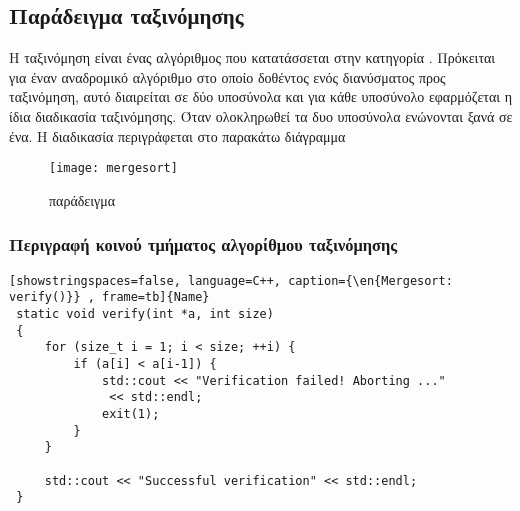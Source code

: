 \subsection{Παράδειγμα ταξινόμησης }
\mbox{}
Η ταξινόμηση \emph{} είναι ένας αλγόριθμος που κατατάσσεται στην κατηγορία . Πρόκειται για έναν αναδρομικό αλγόριθμο στο οποίο
δοθέντος ενός διανύσματος προς ταξινόμηση, αυτό διαιρείται σε δύο υποσύνολα και για κάθε υποσύνολο εφαρμόζεται η ίδια διαδικασία ταξινόμησης. Όταν ολοκληρωθεί τα δυο υποσύνολα ενώνονται ξανά σε ένα. Η διαδικασία περιγράφεται στο παρακάτω διάγραμμα\cite{wiki_mergesort}

\begin{figure}[h]
\texttt{[image: mergesort]}
\centering
\captionsetup{justification=centering, singlelinecheck=false}
	\caption{ παράδειγμα}
\label{fig:mergesort}
\end{figure}


\subsubsection{Περιγραφή κοινού τμήματος αλγορίθμου ταξινόμησης }
\mbox{}

\begin{spacing}{1.0}
\begin{lstlisting}[showstringspaces=false, language=C++, caption={\en{Mergesort: verify()}} , frame=tb]{Name}
 static void verify(int *a, int size)
 {
     for (size_t i = 1; i < size; ++i) {
         if (a[i] < a[i-1]) {
             std::cout << "Verification failed! Aborting ..."
              << std::endl;
             exit(1);
         }
     }

     std::cout << "Successful verification" << std::endl;
 }


\end{lstlisting}
\end{spacing}

